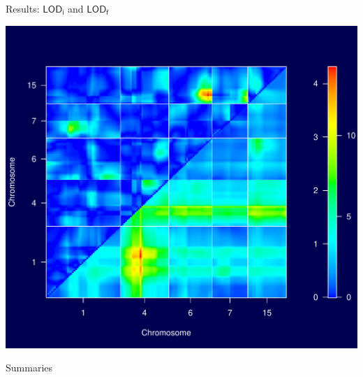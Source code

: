 \documentclass[12pt]{article}
\newcommand{\headsize}{\fontsize{35}{35} \selectfont}
\newcommand{\smallsize}{\fontsize{25}{30} \selectfont}
\newcommand{\lod}{\text{LOD}}
\begin{document}
\newpage

\headsize \color{myyellow}
\hfill \begin{minipage}{5.75in}
\centering
Results: $\mathsf{\lod_i}$ and $\mathsf{\lod_f}$
\end{minipage}

\vfill

\centerline{\includegraphics{FigsB/2dscan_selchr.pdf}}

\newpage

\headsize \color{myyellow}
\hfill \begin{minipage}{5.75in}
\centering
Summaries
\end{minipage}

\vspace{15mm}

\color{mywhite} \smallsize
\end{document}

